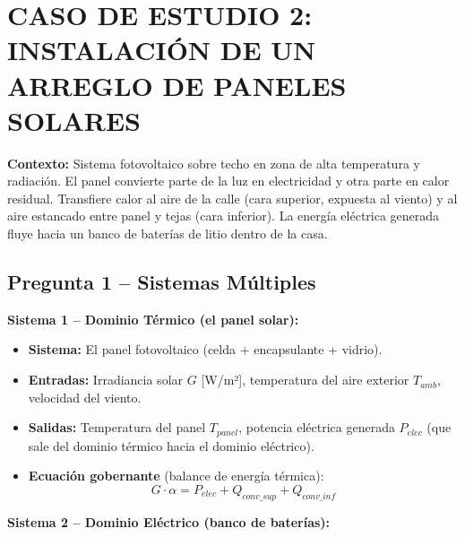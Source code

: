 \documentclass[12pt,a4paper]{article}
\begin{document}
\newpage

\section*{CASO DE ESTUDIO 2: INSTALACIÓN DE UN ARREGLO DE PANELES SOLARES}

\noindent\textbf{Contexto:} Sistema fotovoltaico sobre techo en zona de alta temperatura y
radiación. El panel convierte parte de la luz en electricidad y otra parte en calor residual.
Transfiere calor al aire de la calle (cara superior, expuesta al viento) y al aire estancado entre
panel y tejas (cara inferior). La energía eléctrica generada fluye hacia un banco de baterías de
litio dentro de la casa.

\subsection*{Pregunta 1 -- Sistemas Múltiples}

\noindent\textbf{Sistema 1 -- Dominio Térmico (el panel solar):}

\begin{itemize}
    \item \textbf{Sistema:} El panel fotovoltaico (celda + encapsulante + vidrio).
    \item \textbf{Entradas:} Irradiancia solar $G$ [W/m²], temperatura del aire exterior $T_{amb}$,
          velocidad del viento.
    \item \textbf{Salidas:} Temperatura del panel $T_{panel}$, potencia eléctrica generada
          $P_{elec}$ (que sale del dominio térmico hacia el dominio eléctrico).
    \item \textbf{Ecuación gobernante} (balance de energía térmica):
          \begin{equation}
              G \cdot \alpha = P_{elec} + Q_{conv\_sup} + Q_{conv\_inf}
          \end{equation}
\end{itemize}

\noindent\textbf{Sistema 2 -- Dominio Eléctrico (banco de baterías):}
\end{document}
